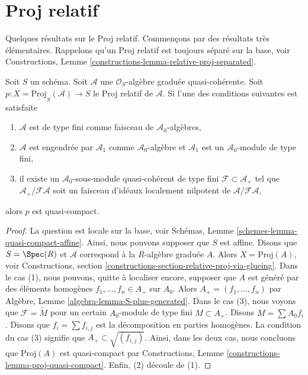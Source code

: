 \section{Proj relatif}
\label{section-relative-proj}

\noindent
Quelques résultats sur le Proj relatif. Commençons par des résultats très
élémentaires. Rappelons qu'un Proj relatif est toujours séparé sur la base, voir
Constructions, Lemme  \ref{constructions-lemma-relative-proj-separated}.

\begin{lemma}
\label{lemma-relative-proj-quasi-compact}
Soit  $S$  un schéma. Soit  $\mathcal{A}$  une  $\mathcal{O}_S$-algèbre graduée
quasi-cohérente. Soit  $p : X = \underline{\text{Proj}}_S(\mathcal{A}) \to S$  le Proj relatif de  $\mathcal{A}$. Si l'une des
conditions suivantes est satisfaite
\begin{enumerate}
\item $\mathcal{A}$  est de type fini comme faisceau de  $\mathcal{A}_0$-algèbres,
\item $\mathcal{A}$  est engendrée par  $\mathcal{A}_1$  comme  $\mathcal{A}_0$-algèbre et
 $\mathcal{A}_1$  est un  $\mathcal{A}_0$-module de type fini,
\item il existe un  $\mathcal{A}_0$-sous-module quasi-cohérent de type fini  $\mathcal{F} \subset \mathcal{A}_{+}$  tel
que  $\mathcal{A}_{+}/\mathcal{F}\mathcal{A}$  soit un faisceau d'idéaux localement nilpotent de  $\mathcal{A}/\mathcal{F}\mathcal{A}$,
\end{enumerate}
alors  $p$  est quasi-compact.
\end{lemma}

\begin{proof}
La question est locale sur la base, voir Schémas, Lemme  \ref{schemes-lemma-quasi-compact-affine}. Ainsi, nous
pouvons supposer que  $S$  est affine. Disons que  $S = \Spec(R)$  et
 $\mathcal{A}$  correspond à la  $R$-algèbre graduée  $A$. Alors
 $X = \text{Proj}(A)$, voir Constructions, section  \ref{constructions-section-relative-proj-via-glueing}. Dans le cas (1), nous
pouvons, quitte à localiser encore, supposer que  $A$ 
est généré par des éléments homogènes  $f_1, \ldots, f_n \in A_{+}$  sur  $A_0$. Alors
 $A_{+} = (f_1, \ldots, f_n)$  par Algèbre, Lemme  \ref{algebra-lemma-S-plus-generated}. Dans le cas (3), nous voyons que
 $\mathcal{F} = \widetilde{M}$  pour un certain  $A_0$-module de type fini  $M \subset A_{+}$. Disons
 $M = \sum A_0f_i$. Disons que  $f_i = \sum f_{i, j}$  est la décomposition en parties homogènes.
La condition du cas (3) signifie que  $A_{+} \subset \sqrt{(f_{i, j})}$. Ainsi, dans les deux cas, nous
concluons que  $\text{Proj}(A)$  est quasi-compact par Constructions, Lemme
 \ref{constructions-lemma-proj-quasi-compact}. Enfin, (2) découle de (1).
\end{proof}

